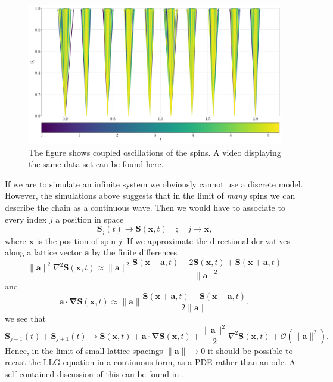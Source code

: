 \begin{figure}[htb]
	\centering
	\includegraphics[width=\columnwidth]{../fig/10_precessions_coupled.pdf}
	\caption{The figure shows coupled oscillations of the spins. A video displaying the same data set can be found \href{https://folk.ntnu.no/sondrdl/spinwaves/coupled.mp4}{here}.}
	\label{fig:coupled_precessions}
\end{figure}

If we are to simulate an infinite system we obviously cannot use a discrete model. However, the simulations above suggests that in the limit of \textit{many} spins we can describe the chain as a continuous wave. Then we would have to associate to every index $j$ a position in space 
$$
	\mathbf{S}_j(t) \to \mathbf{S}(\mathbf{x},t) \quad ; \quad j \to \mathbf{x},
$$
where $\mathbf{x}$ is the position of spin $j$.
If we approximate the directional derivatives along a lattice vector $\mathbf{a}$ by the finite differences 
$$
	 \|\mathbf{a}\|^2  \nabla^2 \mathbf{S}(\mathbf{x},t) \approx \|\mathbf{a}\|^2 \frac{\mathbf{S}(\mathbf{x} - \mathbf{a},t) - 2 \mathbf{S}(\mathbf{x},t) + \mathbf{S}(\mathbf{x} + \mathbf{a},t) }{ \| \mathbf{a} \|^2}
$$
and 
$$
	\mathbf{a} \cdot \boldsymbol{\nabla} \mathbf{S}(\mathbf{x},t) \approx \|\mathbf{a}\| \frac{\mathbf{S}(\mathbf{x}+\mathbf{a},t) - \mathbf{S}(\mathbf{x}-\mathbf{a},t)}{2\|\mathbf{a}\|},
$$
we see that 
$$
	\mathbf{S}_{j-1}(t) + \mathbf{S}_{j+1}(t) \to \mathbf{S}(\mathbf{x},t) + \mathbf{a} \cdot \boldsymbol{\nabla} \mathbf{S}(\mathbf{x},t) + \frac{\| \mathbf{a} \|^2}{2} \nabla^2 \mathbf{S}(\mathbf{x},t) + \mathcal{O}(\|\mathbf{a}\|^2).
$$
Hence, in the limit of small lattice spacings $\|\mathbf{a}\| \to 0$ it should be possible to recast the LLG equation in a continuous form, as a PDE rather than an ode. A self contained discussion of this can be found in \cite{Lakshmanan2011}.